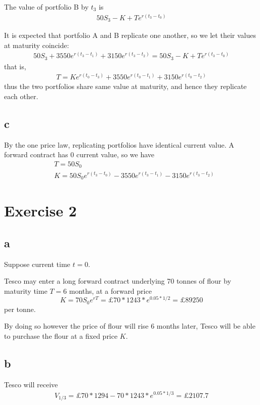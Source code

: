 \documentclass{article}
\begin{document}
The value of portfolio B by $t_3$ is 
\begin{align*}
	50S_3-K+Te^{r(t_3-t_0)}
\end{align*}

It is expected that portfolio A and B replicate one another, so we let their values at maturity coincide:
\begin{align*}
	50S_3+3550e^{r(t_3-t_1)}+3150e^{r(t_3-t_2)}=50S_3-K+Te^{r(t_3-t_0)}
\end{align*}
that is,
\begin{align*}
	T=Ke^{r(t_0-t_3)}+3550e^{r(t_0-t_1)}+3150e^{r(t_0-t_2)}
\end{align*}
thus the two portfolios share same value at maturity, and hence they replicate each other.


\subsection*{c}
By the one price law, replicating portfolios have identical current value. A forward contract has $0$ current value, so we have
\begin{align*}
		&T=50S_0 \\
	&K=50S_0e^{r(t_3-t_0)}-3550e^{r(t_3-t_1)}-3150e^{r(t_3-t_2)}
\end{align*}





\section*{Exercise 2}
\subsection*{a}
Suppose current time $t=0$.

Tesco may enter a long forward contract underlying 70 tonnes of flour by maturity time $T= 6$ months, at a forward price 
$$K=70S_0e^{rT}=\pounds 70*1243*e^{0.05*1/2}=\pounds 89250$$
per tonne.

By doing so however the price of flour will rise 6 months later, Tesco will be able to purchase the flour at a fixed price $K$.



\subsection*{b}
Tesco will receive
\begin{align*}
	V_{1/3}=\pounds 70*1294-70*1243*e^{0.05*1/3}=\pounds 2107.7
\end{align*}
\end{document}
